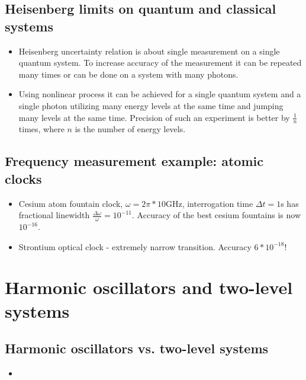 	\subsection{Heisenberg limits on quantum and classical systems}
		\begin{itemize}
			\item Heisenberg uncertainty relation is about single measurement on a single quantum system. To increase accuracy of the measurement it can be repeated many times or can be done on a system with many photons.
			\item Using nonlinear process it can be achieved for a single quantum system and a single photon utilizing many energy levels at the same time and jumping many levels at the same time. Precision of such an experiment is better by $\frac{1}{n}$ times, where $n$ is the number of energy levels.
		\end{itemize}
	\subsection{Frequency measurement example: atomic clocks}
		\begin{itemize}
			\item Cesium atom fountain clock, $\omega=2\pi*10$GHz, interrogation time $\Delta t=1$s has fractional linewidth $\frac{\Delta\omega}{\omega}=10^{-11}$. Accuracy of the best cesium fountains is now $10^{-16}$.
			\item Strontium optical clock - extremely narrow transition. Accuracy $6*10^{-18}$!
		\end{itemize}
		
\section{Harmonic oscillators and two-level systems}
	\subsection{Harmonic oscillators vs. two-level systems}
		\begin{itemize}
			\item 
		\end{itemize}
